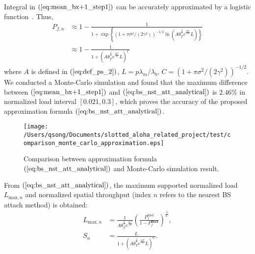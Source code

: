 Integral in $(\ref{eq:mean_bx+1_step1})$ can be accurately approximated by a logistic function~\cite{crooks2009logistic}. Thus,
\begin{align}
\label{eq:bs_nst_att_analytical}
P_{f,n} 
&\approx 1 - \frac{1}{1 + \exp\left\lbrace \left( 1 +\pi \sigma^2 / (2\gamma^2) \right)^{-1/2} \ln( A \theta_{T}^{\frac{2}{\gamma}} e^{\frac{2\sigma^2}{\gamma^2}}  L) \right\rbrace}  \nonumber\\
&\approx 1-\frac{ 1 }{ 1 + \left( A \theta_{T}^{\frac{2}{\gamma}} e^{\frac{2\sigma^2}{\gamma^2}}  L\right) ^{C} }
\end{align}
where $A$ is defined in $(\ref{eq:def_ps_2})$, $L=p\lambda_{m}/\lambda_{b}$, $C= \left( 1 +\pi \sigma^2 / (2\gamma^2) \right)^{-1/2}$. We conducted a Monte-Carlo simulation and found that the maximum difference between $(\ref{eq:mean_bx+1_step1})$ and $(\ref{eq:bs_nst_att_analytical})$ is $2.46\%$ in normalized load interval $\left[ 0.021, 0.3\right] $, which proves the accuracy of the proposed approximation formula $(\ref{eq:bs_nst_att_analytical})$.
\begin{figure}[!ht]
	\centering
	\texttt{[image: /Users/qsong/Documents/slotted\_aloha\_related\_project/test/comparison\_monte\_carlo\_approximation.eps]}
	\caption{Comparison between approximation formula $(\ref{eq:bs_nst_att_analytical})$ and Monte-Carlo simulation result.}
	\label{fig:comparison_monte_carlo}
\end{figure}

From $(\ref{eq:bs_nst_att_analytical})$,  the maximum supported normalized load $L_{\text{max},n}$ and normalized spatial throughput (index $n$ refers to the nearest BS attach method) is obtained:
\begin{align}
\label{eq:bs_nst_att_max_load}
L_{\text{max},n} &= \frac{1}{A \theta_{T}^{\frac{2}{\gamma}} e^{\frac{2\sigma^2}{\gamma^2}} } 
\left(  \frac{P_{f}^{\text{max}}}{1 - P_{f}^{\textbf{max}}} \right) ^{\frac{1}{C}}, \\
\label{eq:bs_nst_att_spatial_throughput}
S_{n} &=  \frac{L}{1 + \left( A \theta_{T}^{\frac{2}{\gamma}} e^{\frac{2\sigma^2}{\gamma^2}}  L\right) ^{C} }.
\end{align}

